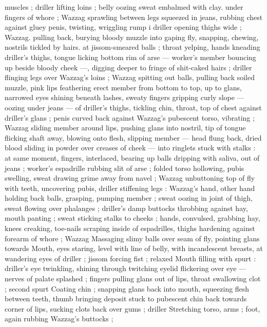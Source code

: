 muscles ; driller lifting loins ; belly oozing sweat embalmed with clay. 
under fingers of whore ; Wazzag sprawling between legs squeezed 
in jeans, rubbing chest against gluey penis, twisting, wriggling rump 
i driller opening thighs wide ; Wazzag. pulling back, burying bloody 
muzzle into gaping fly, snapping, chewing, nostrils tickled by hairs. 
at jissom-smeared balls ; throat yelping, hands kneading driller's 
thighs, tongue licking bottom rim of arse --- worker's member 
bouncing up beside bloody cheek ---, digging deeper to fringe of 
shit-caked hairs ; driller flinging legs over Wazzag's loins ; Wazzag 
spitting out balls, pulling back soiled muzzle, pink lips feathering 
erect member from bottom to top, up to glans, narrowed eyes shining 
beneath lashes, sweaty fingers gripping curly slope --- oozing under 
jeans --- of driller's thighs, tickling chin, throat, top of chest against 
driller's glans ; penis curved back against Wazzag's pubescent torso, 
vibrating ; Wazzag sliding member around lips, pushing glans into 
nostril, tip of tongue flicking shaft away, blowing onto flesh, slipping 
member --- head flung back, dried blood sliding in powder over 
creases of cheek --- into ringlets stuck with stalks : at same moment, 
fingers, interlaced, bearing up balls dripping with saliva, out of jeans 
; worker's espadrille rubbing slit of arse ; folded torso hollowing, 
pubis swelling, sweat drawing grime away from navel ; Wazzag 
unbuttoning top of fly with teeth, uncovering pubis, driller stiffening 
legs : Wazzag's hand, other hand holding back balls, grasping, 
pumping member ; sweat oozing in joint of thigh, sweat flowing over 
phalanges ; driller's damp buttocks throbbing against hay, mouth 
panting ; sweat sticking stalks to cheeks ; hands, convulsed, 
grabbing hay, knees creaking, toe-nails scraping inside of 
espadrilles, thighs hardening against forearm of whore ; Wazzag 
Massaging slimy balls over seam of fly, pointing glans towards 
Mouth, eyes staring, level with line of belly, with incandescent 
breasts, at wandering eyes of driller ; jissom forcing fist ; relaxed 
Mouth filling with spurt : driller's eye twinkling, shining through 
twitching eyelid flickering over eye --- nerves of palate splashed ; 
fingers pulling glans out of lips, throat swallowing clot ; second spurt 
Coating chin ; snapping glans back into mouth, squeezing flesh 
between teeth, thumb bringing deposit stuck to pubescent chin back 
towards corner of lips, sucking clots back over gums ; driller 
Stretching torso, arms ; foot, again rubbing Wazzag's buttocks ; 
